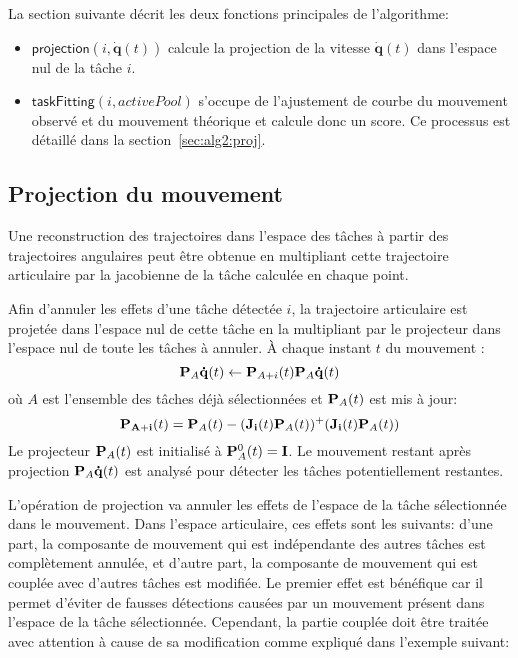 La section suivante décrit les deux fonctions principales de l'algorithme:
\begin{itemize}
  \item $\textsf{projection}(i, \mathbf{\dot{q}}(t))$ calcule la projection
de la vitesse $\dot{\mathbf{q}}(t)$ dans l'espace nul de la t\^ache $i$.
  \item $\textsf{taskFitting}(i, activePool)$ s'occupe de l'ajustement de 
courbe du mouvement observé et du mouvement théorique et calcule donc un score. 
Ce processus est détaillé dans la section~\ref{sec:alg2:proj}.
\end{itemize}

\subsection{Projection du mouvement}
\label{sec:alg2:nullification}
Une reconstruction des trajectoires dans l'espace des t\^aches à partir des trajectoires 
angulaires peut être obtenue en multipliant cette trajectoire articulaire par la 
jacobienne de la t\^ache calculée en chaque point.

Afin d'annuler les effets d'une t\^ache détectée $i$, 
la trajectoire articulaire est projetée dans l'espace nul
de cette t\^ache en la multipliant par le projecteur dans l'espace nul
de toute les t\^aches à annuler.
\`A chaque instant $t$ du mouvement :
\begin{equation}
  \mbf{P}_A\mbf{\dot{q}}(t) \leftarrow \mbf{P}_{A+i}(t) \mbf{P}_A\mbf{\dot{q}}(t) 
  \label{eq:projection}
\end{equation}
où $A$ est l'ensemble des t\^aches déjà sélectionnées et ${\mathbf{P}}_A(t)$ est mis à jour:
\begin{equation*}
  \mbf{P_{A+i}}(t) = \mbf{P}_A(t) - (\mbf{J_{i}}(t)\mbf{P}_A(t))^+(\mbf{J_{i}}(t)\mbf{P}_A(t))
  \label{eq:projectionupdate}
\end{equation*}
Le projecteur ${\mathbf{P}}_A(t)$ est initialisé à ${\mathbf{P}}_A^0(t) = {\mathbf{I}}$. Le mouvement
restant après projection ${\mathbf{P}}_A{\mathbf{\dot{q}}}(t)$ est analysé pour détecter
les t\^aches potentiellement restantes.

L'opération de projection va annuler les effets de l'espace
de la t\^ache sélectionnée dans le mouvement. Dans l'espace articulaire,
ces effets sont les suivants: d'une part, la composante de mouvement
qui est indépendante des autres t\^aches est complètement annulée, et d'autre part, la composante 
de mouvement qui est couplée avec d'autres t\^aches est modifiée.
Le premier effet est bénéfique car il permet d'éviter
de fausses détections causées par un mouvement présent dans 
l'espace de la t\^ache sélectionnée.
Cependant, la partie couplée doit \^etre traitée avec attention
à cause de sa modification comme expliqué dans l'exemple suivant:

